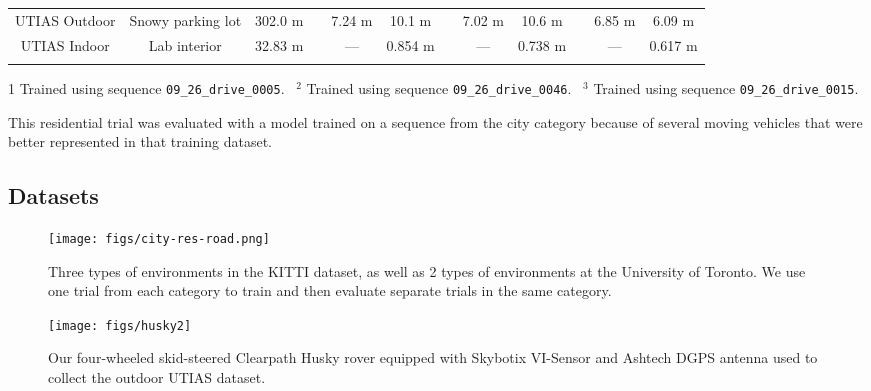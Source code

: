 \documentclass[letterpaper, 10 pt, conference]{ieeeconf}  %
\newcommand\B{\rule[-1.2ex]{0pt}{0pt}} %
\begin{document}
\begin{table*}
\begin{threeparttable}
\begin{tabular}{cccccccccccc}
                UTIAS Outdoor & Snowy parking lot & 302.0 m && 7.24 m & 10.1 m && 7.02 m & 10.6 m && 6.85 m & 6.09 m \\ 
                UTIAS Indoor & Lab interior & 32.83 m && --- & 0.854 m && --- & 0.738 m && --- & 0.617 m  \B \\    
        \hline
            \label{table:kitti_data}
        \end{tabular}
        \begin{tablenotes}
            \item[1] Trained using sequence \texttt{09\_26\_drive\_0005}. ~$^2$ Trained using sequence  \texttt{09\_26\_drive\_0046}. ~$^3$ Trained using sequence  \texttt{09\_26\_drive\_0015}.  
            \item[\dag] This residential trial was evaluated with a model trained on a sequence from the city category because of several moving vehicles that were better represented in that training dataset.
        \end{tablenotes}
    \end{threeparttable}
\end{table*}

\subsection{Datasets}
\begin{figure*}
    \centering
    \texttt{[image: figs/city-res-road.png]}
    \caption{Three types of environments in the KITTI dataset, as well as 2 types of environments at the University of Toronto.  We use one trial from each category to train and then evaluate separate trials in the same category.}
    \label{fig:KITTI-Types}
    \vspace{-0.2cm}
\end{figure*}

\begin{figure}
    \centering
    \texttt{[image: figs/husky2]}
    \caption{Our four-wheeled skid-steered Clearpath Husky rover equipped with Skybotix VI-Sensor and Ashtech DGPS antenna used to collect the outdoor UTIAS dataset.}
    \label{fig:huskypic}
\end{figure}
\end{document}

